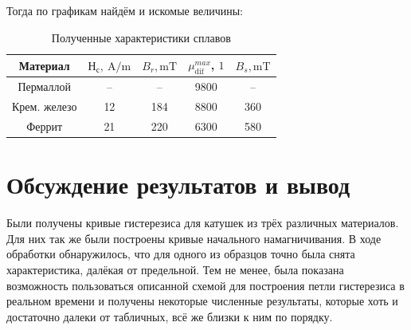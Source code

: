 \documentclass[12pt, a4paper]{article}
\begin{document}
Тогда по графикам найдём и искомые величины:
\begin{table}[H]
  \centering
  \begin{tabular}{|c|c|c|c|c|}
    \hline
    Материал      & $Н_с,~\mathrm{A/m}$
    & $B_r, \mathrm{mT}$
    & $\mu _\text{dif}^{max}$, $\mathrm{1}$
    & $B_s, \mathrm{mT}$ \\ \hline
    Пермаллой     & -- & -- & 9800 &   --    \\ \hline
    Крем. железо  & 12 & 184 & 8800 &  360    \\ \hline
    Феррит        & 21 & 220 & 6300 &  580    \\ \hline
  \end{tabular}
  \caption{Полученные характеристики сплавов}
  \label{tab:chars}
\end{table}


\section{Обсуждение результатов и вывод}
Были получены кривые гистерезиса для катушек из трёх различных материалов. 
Для них так же были построены кривые начального намагничивания. В ходе обработки обнаружилось, 
что для одного из образцов точно была снята характеристика, далёкая от предельной. Тем не менее,
была показана возможность пользоваться описанной схемой для построения петли гистерезиса в реальном времени
и получены некоторые численные результаты, которые хоть и достаточно далеки от табличных, 
всё же близки к ним по порядку. 
\end{document}
